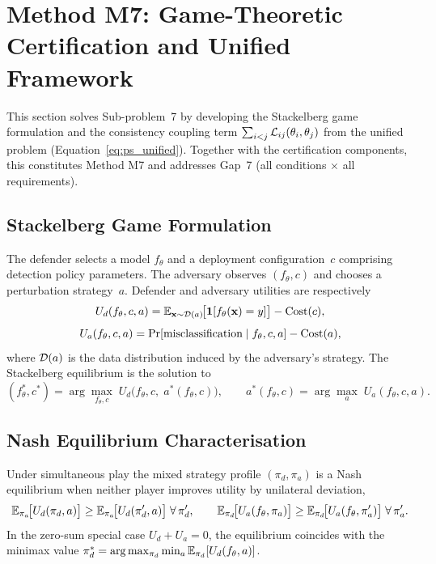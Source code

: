 \section{Method M7: Game-Theoretic Certification and Unified Framework}
\label{sec:game}

This section solves Sub-problem~7 by developing the Stackelberg game formulation and the consistency coupling term $\sum_{i<j}\mathcal{L}_{ij}(\theta_i,\theta_j)$ from the unified problem (Equation~\eqref{eq:ps_unified}). Together with the certification components, this constitutes Method M7 and addresses Gap~7 (all conditions $\times$ all requirements).

\subsection{Stackelberg Game Formulation}

The defender selects a model $f_\theta$ and a deployment configuration~$c$ comprising detection policy parameters. The adversary observes $(f_\theta,c)$ and chooses a perturbation strategy~$a$. Defender and adversary utilities are respectively
\begin{equation}
U_d(f_\theta,c,a)
= \mathbb{E}_{\mathbf{x}\sim\mathcal{D}(a)}\!\bigl[\mathbf{1}[f_\theta(\mathbf{x})=y]\bigr] - \mathrm{Cost}(c),
\label{eq:game_ud}
\end{equation}
\begin{equation}
U_a(f_\theta,c,a)
= \mathrm{Pr}[\text{misclassification}\mid f_\theta,c,a] - \mathrm{Cost}(a),
\label{eq:game_ua}
\end{equation}
where $\mathcal{D}(a)$ is the data distribution induced by the adversary's strategy. The Stackelberg equilibrium is the solution to
\begin{equation}
(f_\theta^*,c^*)
= \arg\max_{f_\theta,c}\;U_d\!\bigl(f_\theta,c,\;a^*(f_\theta,c)\bigr),
\qquad
a^*(f_\theta,c)=\arg\max_a\;U_a(f_\theta,c,a).
\label{eq:game_stackel}
\end{equation}

\subsection{Nash Equilibrium Characterisation}

Under simultaneous play the mixed strategy profile $(\pi_d,\pi_a)$ is a Nash equilibrium when neither player improves utility by unilateral deviation,
\begin{equation}
\mathbb{E}_{\pi_a}\!\bigl[U_d(\pi_d,a)\bigr]
\ge \mathbb{E}_{\pi_a}\!\bigl[U_d(\pi_d',a)\bigr]\;\forall\,\pi_d',
\qquad
\mathbb{E}_{\pi_d}\!\bigl[U_a(f_\theta,\pi_a)\bigr]
\ge \mathbb{E}_{\pi_d}\!\bigl[U_a(f_\theta,\pi_a')\bigr]\;\forall\,\pi_a'.
\label{eq:game_nash}
\end{equation}
In the zero-sum special case $U_d+U_a=0$, the equilibrium coincides with the minimax value $\pi_d^*=\arg\max_{\pi_d}\min_a\mathbb{E}_{\pi_d}[U_d(f_\theta,a)]$.

